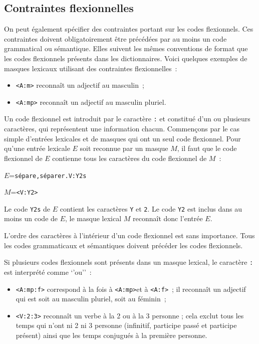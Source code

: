 \subsection{Contraintes flexionnelles}
On peut également spécifier des contraintes portant sur les codes flexionnels. Ces con\-traintes
doivent obligatoirement être précédées par au moins un code grammatical ou sémantique. Elles suivent
les mêmes conventions de format que les codes flexionnels présents dans les dictionnaires.
Voici quelques exemples de masques lexicaux utilisant des contraintes flexionnelles~:

\begin{itemize}
  \item \verb+<A:m>+ reconnaît un adjectif au masculin~;
  \item \verb+<A:mp>+ reconnaît un adjectif au masculin pluriel.
\end{itemize}

\noindent Un code flexionnel est introduit par le caractère \verb+:+ et constitué d'un ou plusieurs
caractères, qui représentent une information chacun. Commençons par le cas simple d'entrées
lexicales et de masques qui ont un seul code flexionnel. Pour qu'une entrée lexicale $E$ soit reconnue
par un masque $M$, il faut que le code flexionnel de $E$ contienne tous les caractères du code flexionnel de $M$~:

\bigskip
$E$=\verb$sépare,séparer.V:Y2s$

$M$=\verb$<V:Y2>$

\bigskip
\noindent Le code \verb+Y2s+ de $E$ contient les caractères \verb+Y+ et \verb+2+. Le
code \verb+Y2+ est inclus dans au moins un code de $E$, le masque lexical $M$ reconnaît donc l’entrée $E$.

\bigskip
\noindent L’ordre des caractères à l’intérieur d’un code flexionnel est sans importance. Tous les codes
grammaticaux et sémantiques doivent précéder les codes flexionnels.

\bigskip
\noindent Si plusieurs codes flexionnels sont présents dans un masque lexical, le caractère \verb+:+ est
interprété comme `'ou''~:

\begin{itemize}
  \item \verb+<A:mp:f>+ correspond à la fois à  \verb+<A:mp>+et à \verb+<A:f>+~; il reconnaît un adjectif
  qui est soit au masculin pluriel, soit au féminin~;
  \item \verb+<V:2:3>+ reconnaît un verbe à la 2{\ieme} ou à la 3{\ieme} personne ; cela exclut tous les
  temps qui n’ont ni 2{\ieme} ni 3{\ieme} personne (infinitif, participe passé et participe présent)
  ainsi que les temps conjugués à la première personne.
\end{itemize}

